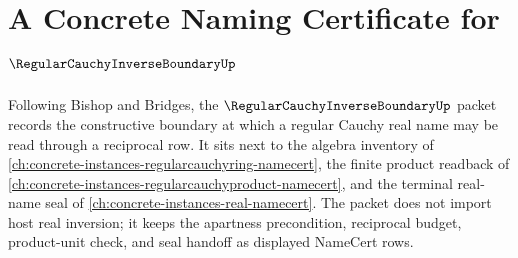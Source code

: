 \chapter{A Concrete Naming Certificate for $\RegularCauchyInverseBoundaryUp$}
\label{ch:concrete-instances-regular-cauchy-inverse-boundary-namecert}

Following Bishop and Bridges, the $\RegularCauchyInverseBoundaryUp$ packet records the constructive boundary at which a regular Cauchy real name may be read through a reciprocal row. It sits next to the algebra inventory of \autoref{ch:concrete-instances-regularcauchyring-namecert}, the finite product readback of \autoref{ch:concrete-instances-regularcauchyproduct-namecert}, and the terminal real-name seal of \autoref{ch:concrete-instances-real-namecert}. The packet does not import host real inversion; it keeps the apartness precondition, reciprocal budget, product-unit check, and seal handoff as displayed NameCert rows.

